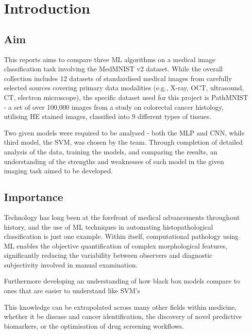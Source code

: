 \documentclass[../main.tex]{subfiles}
\begin{document}
\section{Introduction}
\noindent  
\subsection{Aim}
This reports aims to compare three \gls{ML} algorithms on a medical image classification task involving the MedMNIST v2 dataset. While the overall collection includes 12 datasets of standardised medical images from carefully selected sources covering primary data modalities (e.g., X-ray, OCT, ultrasound, CT, electron microscope), the specific dataset used for this project is PathMNIST - a set of over 100,000 images from a study on colorectal cancer histology, utilising \gls{HE} stained images, classified into 9 different types of tissues\cite{yang2023medmnistv2}. 

\noindent Two given models were required to be analysed - both the \gls{MLP} and \gls{CNN}, while third model, the \gls{SVM}, was chosen by the team. Through completion of detailed analysis of the data, training the models, and comparing the results, an understanding of the strengths and weaknesses of each model in the given imaging task aimed to be developed.


\subsection{Importance}
Technology has long been at the forefront of medical advancements throughout history, and the use of \gls{ML} techniques in automating histopathological classification is just one example. Within itself, computational pathology using \gls{ML} enables the objective quantification of complex morphological features, significantly reducing the variability between observers and diagnostic subjectivity involved in manual examination.

Furthermore developing an understanding of how black box models compare to ones that are easier to understand like SVM's

This knowledge can be extrapolated across many other fields within medicine, whether it be disease and cancer identification, the discovery of novel predictive biomarkers, or the optimisation of drug screening workflows.


\noindent 
\end{document}
